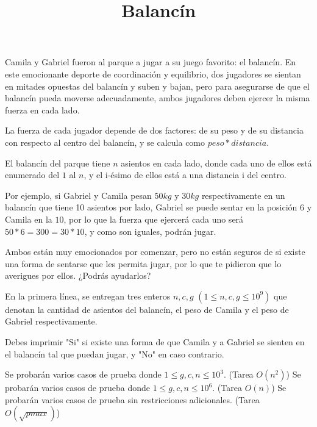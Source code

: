 \documentclass{oci}
\title{Balancín}
\begin{document}
\begin{problemDescription}
	Camila y Gabriel fueron al parque a jugar a su juego favorito: el balancín.
	En este emocionante deporte de coordinación y equilibrio, dos jugadores se sientan en mitades opuestas del balancín y suben y bajan, pero para asegurarse de que el balancín pueda moverse adecuadamente, ambos jugadores deben ejercer la misma fuerza en cada lado.

	La fuerza de cada jugador depende de dos factores: de su peso y de su distancia con respecto al centro del balancín, y se calcula como $peso * distancia$.

	El balancín del parque tiene $n$ asientos en cada lado, donde cada uno de ellos está enumerado del $1$ al $n$, y el i-ésimo de ellos está a una distancia i del centro.

	Por ejemplo, si Gabriel y Camila pesan $50kg$ y $30kg$ respectivamente en un balancín que tiene 10 asientos por lado, Gabriel se puede sentar en la posición $6$ y Camila en la $10$, por lo que la fuerza que ejercerá cada uno será $50*6=300=30*10$, y como son iguales, podrán jugar.

	Ambos están muy emocionados por comenzar, pero no están seguros de si existe una forma de sentarse que les permita jugar, por lo que te pidieron que lo averigues por ellos. ¿Podrás ayudarlos?

\end{problemDescription}

\begin{inputDescription}
	En la primera línea, se entregan tres enteros $n, c, g$ $(1 \leq n, c, g \leq 10^9)$ que denotan la cantidad de asientos del balancín, el peso de Camila y el peso de Gabriel respectivamente.
\end{inputDescription}

\begin{outputDescription}
	Debes imprimir "Si" si existe una forma de que Camila y a Gabriel se sienten en el balancín tal que puedan jugar, y "No" en caso contrario.
\end{outputDescription}

\begin{scoreDescription}
	 Se probarán varios casos de prueba donde $1 \leq g, c, n \leq 10^3$. (Tarea $O(n^2)$)
	 Se probarán varios casos de prueba donde $1 \leq g, c, n \leq 10^6$. (Tarea $O(n)$)
	 Se probarán varios casos de prueba sin restricciones adicionales. (Tarea $O(\sqrt{pmax})$)
\end{scoreDescription}

\begin{sampleDescription}
\end{sampleDescription}
\end{document}

